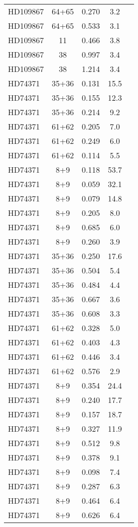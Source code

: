 \begin{table*}
\begin{tabular}{l c c c c}
HD109867 & 64+65 & 0.270 & 3.2\\ 
HD109867 & 64+65 & 0.533 & 3.1\\ 
HD109867 & 11 & 0.466 & 3.8\\ 
HD109867 & 38 & 0.997 & 3.4\\ 
HD109867 & 38 & 1.214 & 3.4\\ 
\hline
HD74371 & 35+36 & 0.131 & 15.5\\ 
HD74371 & 35+36 & 0.155 & 12.3\\ 
HD74371 & 35+36 & 0.214 & 9.2\\ 
HD74371 & 61+62 & 0.205 & 7.0\\ 
HD74371 & 61+62 & 0.249 & 6.0\\ 
HD74371 & 61+62 & 0.114 & 5.5\\ 
HD74371 & 8+9 & 0.118 & 53.7\\ 
HD74371 & 8+9 & 0.059 & 32.1\\ 
HD74371 & 8+9 & 0.079 & 14.8\\ 
HD74371 & 8+9 & 0.205 & 8.0\\ 
HD74371 & 8+9 & 0.685 & 6.0\\ 
HD74371 & 8+9 & 0.260 & 3.9\\ 
HD74371 & 35+36 & 0.250 & 17.6\\ 
HD74371 & 35+36 & 0.504 & 5.4\\ 
HD74371 & 35+36 & 0.484 & 4.4\\ 
HD74371 & 35+36 & 0.667 & 3.6\\ 
HD74371 & 35+36 & 0.608 & 3.3\\ 
HD74371 & 61+62 & 0.328 & 5.0\\ 
HD74371 & 61+62 & 0.403 & 4.3\\ 
HD74371 & 61+62 & 0.446 & 3.4\\ 
HD74371 & 61+62 & 0.576 & 2.9\\ 
HD74371 & 8+9 & 0.354 & 24.4\\ 
HD74371 & 8+9 & 0.240 & 17.7\\ 
HD74371 & 8+9 & 0.157 & 18.7\\ 
HD74371 & 8+9 & 0.327 & 11.9\\ 
HD74371 & 8+9 & 0.512 & 9.8\\ 
HD74371 & 8+9 & 0.378 & 9.1\\ 
HD74371 & 8+9 & 0.098 & 7.4\\ 
HD74371 & 8+9 & 0.287 & 6.3\\ 
HD74371 & 8+9 & 0.464 & 6.4\\ 
HD74371 & 8+9 & 0.626 & 6.4\\ 

\end{tabular}
\end{table*}
